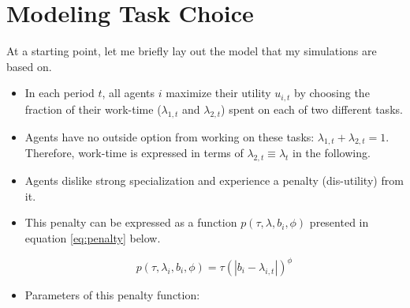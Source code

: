 \documentclass{article}
\begin{document}
\section{Modeling Task Choice}
	At a starting point, let me briefly lay out the model that my simulations are based on.
	\begin{itemize}
		\item{In each period $t$, all agents $i$ maximize their utility $u_{i,t}$ by choosing the fraction of their work-time ($\lambda_{1,t}$ and $\lambda_{2,t}$) spent on each of two different tasks.}
		\item{Agents have no outside option from working on these tasks: $\lambda_{1,t} + \lambda_{2,t}=1$. Therefore, work-time is expressed in terms of $\lambda_{2,t} \equiv \lambda_t$ in the following.}
		\item{Agents dislike strong specialization and experience a penalty (dis-utility) from it.}
		\item{This penalty can be expressed as a function $p(\tau, \lambda, b_i, \phi)$ presented in equation \ref{eq:penalty} below.}
		

		\begin{equation}\label{eq:penalty}
		p(\tau, \lambda_i, b_i, \phi) = 
			 \tau (|b_i - \lambda_{i, t}|)^\phi   %
		\end{equation}

		\item{Parameters of this penalty function:}


\end{itemize}
\end{document}
